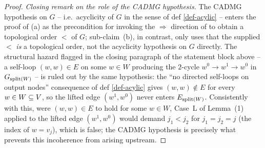 \documentclass[main]{subfiles}
\begin{document}
\begin{proof}
\medskip\noindent\emph{Closing remark on the role of the CADMG hypothesis.}
The CADMG hypothesis on $G$ -- i.e.\ acyclicity of $G$ in the sense of def \ref{def-acylic} -- enters the proof of (a) as the precondition for invoking the $\Rightarrow$ direction of  to obtain a topological order $<$ of $G$; sub-claim~(b), in contrast, only uses that the supplied $<$ \emph{is} a topological order, not the acyclicity hypothesis on $G$ directly. The structural hazard flagged in the closing paragraph of the statement block above -- a self-loop $(w, w) \in E$ on some $w \in W$ producing the $2$-cycle $w^0 \to w^1 \to w^0$ in $G_{\mathrm{split}(W)}$ -- is ruled out by the same hypothesis: the ``no directed self-loops on output nodes'' consequence of def \ref{def-acylic} gives $(w, w) \notin E$ for every $w \in W \subseteq V$, so the lifted edge $(w^1, w^0)$ never enters $E_{\mathrm{split}(W)}$. Consistently with this, were $(w, w) \in E$ to hold for some $w \in W$, Case~L of Lemma~(1) applied to the lifted edge $(w^1, w^0)$ would demand $j_1 < j_2$ for $j_1 = j_2 = j$ (the index of $w = v_j$), which is false; the CADMG hypothesis is precisely what prevents this incoherence from arising upstream.
\end{proof}
\end{document}
